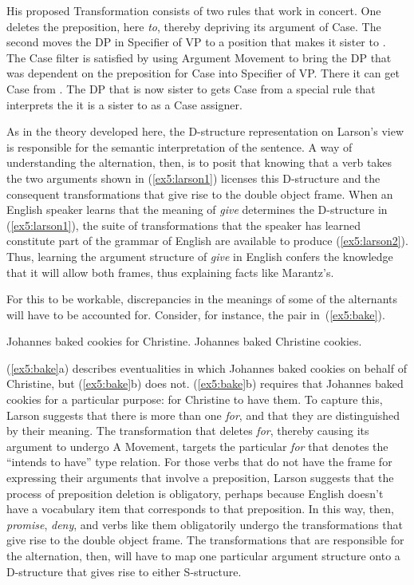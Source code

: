 His proposed Transformation consists of two rules that work in concert. One deletes the preposition, here \emph{to}, thereby depriving its argument of Case. The second moves the DP in Specifier of VP to a position that makes it sister to . The Case filter is satisfied by using Argument Movement to bring the DP that was dependent on the preposition for Case into Specifier of VP. There it can get Case from . The DP that is now sister to  gets Case from a special rule that interprets the  it is a sister to as a Case assigner. 

As in the theory developed here, the D-structure representation on Larson's view is responsible for the semantic interpretation of the sentence. A way of understanding the alternation, then, is to posit that knowing that a verb takes the two arguments shown in (\ref{ex5:larson1}) licenses this D-structure and the consequent transformations that give rise to the double object frame. When an English speaker learns that the meaning of \emph{give} determines the D-structure in (\ref{ex5:larson1}), the suite of transformations that the speaker has learned constitute part of the grammar of English are available to produce (\ref{ex5:larson2}). Thus, learning the argument structure of \emph{give} in English confers the knowledge that it will allow both frames, thus explaining facts like Marantz's. 

For this to be workable, discrepancies in the meanings of some of the alternants will have to be accounted for. Consider, for instance, the pair in~(\ref{ex5:bake}).
\begin{exe}
	\raggedright
	\ex \label{ex5:bake} 
	\begin{xlist}
		\ex Johannes baked cookies for Christine.
		\ex Johannes baked Christine cookies.
	\end{xlist}
\end{exe}
(\ref{ex5:bake}a) describes eventualities in which Johannes baked cookies on behalf of Christine, but (\ref{ex5:bake}b) does not. (\ref{ex5:bake}b) requires that Johannes baked cookies for a particular purpose: for Christine to have them. To capture this, Larson suggests that there is more than one \emph{for}, and that they are distinguished by their meaning. The transformation that deletes \emph{for}, thereby causing its argument to undergo A Movement, targets the particular \emph{for} that denotes the ``intends to have'' type relation. For those verbs that do not have the frame for expressing their arguments that involve a preposition, Larson suggests that the process of preposition deletion is obligatory, perhaps because English doesn't have a vocabulary item that corresponds to that preposition. In this way, then, \emph{promise}, \emph{deny}, and verbs like them obligatorily undergo the transformations that give rise to the double object frame. The transformations that are responsible for the alternation, then, will have to map one particular argument structure onto a D-structure that gives rise to either S-structure.

